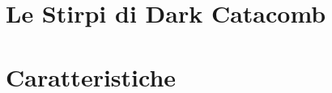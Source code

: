 \documentclass[12pt,a4paper,twoside,openany]{book}
\begin{document}
\pagebreak

\section{Le Stirpi di Dark Catacomb}

\begin{multicols}{2}
	
\end{multicols}



\pagebreak

\section{Caratteristiche}
\end{document}

